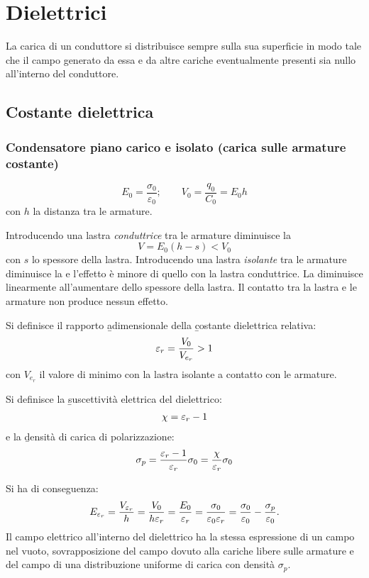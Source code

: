 \chapter{Dielettrici}%
La carica di un conduttore si distribuisce sempre sulla sua superficie in modo tale che il campo generato da essa e da altre cariche eventualmente presenti sia nullo all'interno del conduttore.

\section{Costante dielettrica}%
\subsection{Condensatore piano carico e isolato (carica sulle armature costante)}
$$E_0=\frac{\sigma_0}{\varepsilon_0}; \qquad V_0=\frac{q_0}{C_0}=E_0h$$ con $h$ la distanza tra le armature.

Introducendo una lastra \emph{conduttrice} tra le armature diminuisce la \ddp $$V=E_0(h-s)<V_0$$ con $s$ lo spessore della lastra. Introducendo una lastra \emph{isolante} tra le armature diminuisce la \ddp e l'effetto è minore di quello con la lastra conduttrice. La \ddp diminuisce linearmente all'aumentare dello spessore della lastra. Il contatto tra la lastra e le armature non produce nessun effetto.

Si definisce il rapporto \b{adimensionale} della \b{costante dielettrica relativa}:
\begin{equation}\begin{split}
{\varepsilon_r}=\frac{V_0}{V_{e_r}}>1
\end{split}\end{equation}
con $V_{e_r}$ il valore di \ddp minimo con la lastra isolante a contatto con le armature.

Si definisce la \b{suscettività elettrica del dielettrico}:
\begin{equation}\begin{split}
\chi={\varepsilon_r}-1
\end{split}\end{equation}
e la \b{densità di carica di polarizzazione}:
\begin{equation}\begin{split}
\sigma_p=\frac{{\varepsilon_r}-1}{{\varepsilon_r}}\sigma_0=\frac{\chi}{{\varepsilon_r}}\sigma_0
\end{split}\end{equation}

Si ha di conseguenza:
\begin{equation}\begin{split}
E_{\varepsilon_r}=\frac{V_{{\varepsilon_r}}}{h}=\frac{V_0}{h{\varepsilon_r}}=\frac{E_0}{{\varepsilon_r}}=\frac{\sigma_0}{\varepsilon_0 {\varepsilon_r}}=\frac{\sigma_0}{\varepsilon_0}-\frac{\sigma_p}{\varepsilon_0}.
\end{split}\end{equation}
Il campo elettrico all'interno del dielettrico ha la stessa espressione di un campo nel vuoto, sovrapposizione del campo dovuto alla cariche libere sulle armature e del campo di una distribuzione uniforme di carica con densità $\sigma_p$.

